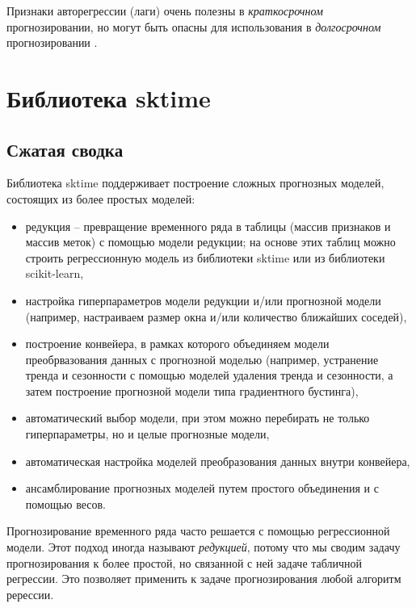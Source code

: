 \documentclass[%
	11pt,
	a4paper,
	utf8,
		]{article}
\begin{document}
Признаки авторегрессии (лаги) очень полезны в \emph{краткосрочном} прогнозировании, но могут быть опасны для использования в \emph{долгосрочном} прогнозировании \cite[]{gruzdev:time-series-2022}.

\section{Библиотека sktime}

\subsection{Сжатая сводка}

Библиотека sktime поддерживает построение сложных прогнозных моделей, состоящих из более простых моделей:
\begin{itemize}
	\item редукция -- превращение временного ряда в таблицы (массив признаков и массив меток) с помощью модели редукции; на основе этих таблиц можно строить регрессионную модель из библиотеки sktime или из библиотеки scikit-learn,
	
	\item настройка гиперпараметров модели редукции и/или прогнозной модели (например, настраиваем размер окна и/или количество ближайших соседей),
	
	\item построение конвейера, в рамках которого объединяем модели преобрвазования данных с прогнозной моделью (например, устранение тренда и сезонности с помощью моделей удаления тренда и сезонности, а затем построение прогнозной модели типа градиентного бустинга),
	
	\item автоматический выбор модели, при этом можно перебирать не только гиперпараметры, но и целые прогнозные модели,
	
	\item автоматическая настройка моделей преобразования данных внутри конвейера,
	
	\item ансамблирование прогнозных моделей путем простого объединения и с помощью весов.
\end{itemize}

Прогнозирование временного ряда часто решается с помощью регрессионной модели. Этот подход иногда называют \emph{редукцией}, потому что мы сводим задачу прогнозирования к более простой, но связанной с ней задаче табличной регрессии. Это позволяет применить к задаче прогнозирования любой алгоритм ререссии.
\end{document}
